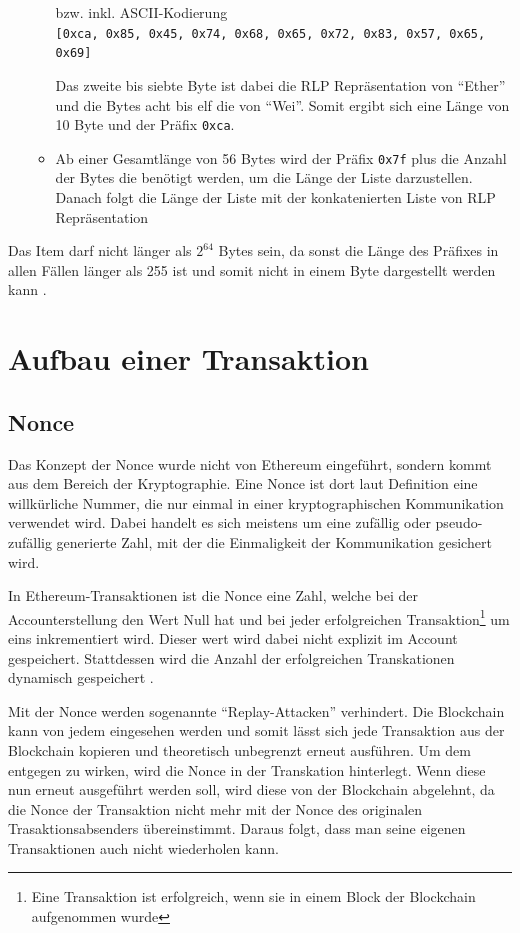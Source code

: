 \documentclass[runningheads]{llncs}
\begin{document}
\begin{enumerate}
\begin{itemize}
\begin{center}
                  bzw. inkl. ASCII-Kodierung\\
                  \texttt{[0xca, 0x85, 0x45, 0x74, 0x68, 0x65, 0x72, 0x83, 0x57, 0x65, 0x69]}
                \end{center}
                Das zweite bis siebte Byte ist dabei die RLP Repräsentation von "`Ether"' und die Bytes acht bis elf die von "`Wei"'. Somit ergibt sich eine Länge von 10 Byte und der Präfix \verb+0xca+.
          \item Ab einer Gesamtlänge von 56 Bytes wird der Präfix \texttt{0x7f} plus die Anzahl der Bytes die benötigt werden, um die Länge der Liste darzustellen. Danach folgt die Länge der Liste mit der konkatenierten Liste von RLP Repräsentation
        \end{itemize}
\end{enumerate}
Das Item darf nicht länger als $2^{64}$ Bytes sein, da sonst die Länge des Präfixes in allen Fällen länger als 255 ist und somit nicht in einem Byte dargestellt werden kann \cite[S.18,19]{wood_ethereum/yellowpaper_2019}.
\section{Aufbau einer Transaktion}

\subsection{Nonce}
\label{nonce}
Das Konzept der Nonce wurde nicht von Ethereum eingeführt, sondern kommt aus dem Bereich der Kryptographie. Eine Nonce ist dort laut Definition \cite{noauthor_ethereum/wiki/rlp_nodate}
eine willkürliche Nummer, die nur einmal in einer kryptographischen Kommunikation verwendet wird. Dabei handelt es sich meistens um eine zufällig oder pseudo-zufällig generierte Zahl, mit der die Einmaligkeit der Kommunikation gesichert wird.

In Ethereum-Transaktionen ist die Nonce eine Zahl, welche bei der Accounterstellung den Wert Null hat und bei jeder erfolgreichen Transaktion\footnote{Eine Transaktion ist erfolgreich, wenn sie in einem Block der Blockchain aufgenommen wurde} um eins inkrementiert wird. Dieser wert wird dabei nicht explizit im Account gespeichert. Stattdessen wird die Anzahl der erfolgreichen Transkationen dynamisch gespeichert \cite[S.101]{antonopoulos_mastering_2019}.

Mit der Nonce werden sogenannte "`Replay-Attacken"' verhindert. Die Blockchain kann von jedem eingesehen werden und somit lässt sich jede Transaktion aus der Blockchain kopieren und theoretisch unbegrenzt erneut ausführen. Um dem entgegen zu wirken, wird die Nonce in der Transkation hinterlegt. Wenn diese nun erneut ausgeführt werden soll, wird diese von der Blockchain abgelehnt, da die Nonce der Transaktion nicht mehr mit der Nonce des originalen Trasaktionsabsenders übereinstimmt. Daraus folgt, dass man seine eigenen Transaktionen auch nicht wiederholen kann.
\end{document}
